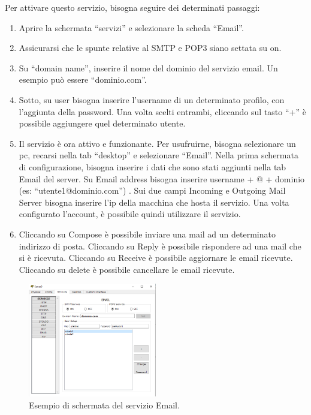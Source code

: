 Per attivare questo servizio, bisogna seguire dei determinati passaggi:

\begin{enumerate}
    \item Aprire la schermata “servizi” e selezionare la scheda “Email”.
    \item Assicurarsi che le spunte relative al SMTP e POP3 siano settata su on.
    \item Su “domain name”, inserire il nome del dominio del servizio email. Un esempio può essere “dominio.com”.
    \item Sotto, su user bisogna inserire l’username di un determinato profilo, con l’aggiunta della password. Una volta scelti entrambi, cliccando sul tasto “+” è possibile aggiungere quel determinato utente.
    \item Il servizio è ora attivo e funzionante. Per usufruirne, bisogna selezionare un pc, recarsi nella tab “desktop” e selezionare “Email”. Nella prima schermata di configurazione, bisogna inserire i dati che sono stati aggiunti nella tab Email del server. Su Email address bisogna inserire username + @ + dominio (es: “utente1@dominio.com”) . Sui due campi Incoming e Outgoing Mail Server bisogna inserire l’ip della macchina che hosta il servizio. Una volta configurato l’account, è possibile quindi utilizzare il servizio.
    \item Cliccando su Compose è possibile inviare una mail ad un determinato indirizzo di posta. Cliccando su Reply è possibile rispondere ad una mail che si è ricevuta. Cliccando su Receive è possibile aggiornare le email ricevute. Cliccando su delete è possibile cancellare le email ricevute.
\end{enumerate}

\begin{figure}[h]
    \centering
    \includegraphics[width=0.5\textwidth]{images/06.03.01.png}
    \caption{Esempio di schermata del servizio Email.}
    \label{fig:email-conf-server}
\end{figure}

